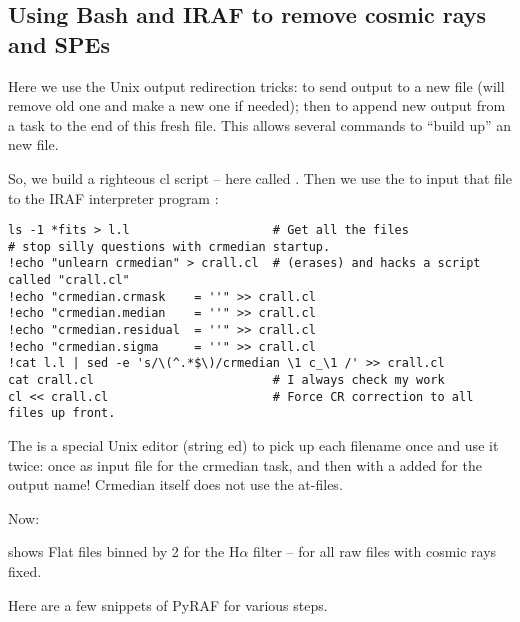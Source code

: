 \documentclass[letter,11pt,oneside]{article}
\begin{document}
\subsection{Using Bash and IRAF to remove cosmic rays and SPEs}

Here we use the Unix output redirection tricks: {\color{verbcolor}{\verb#> l.l#}}
to send output to a new file (will remove old one and make a new one if needed);
then {\color{verbcolor}{\verb#>> l.l#}} to append new output from a task
to the end of this fresh file. This allows several commands to 
``build up'' an new file. 

So, we build a righteous cl script -- here called {\color{verbcolor}{\verb#crall.cl#}}.
Then we use the {\color{verbcolor}{\verb#< crall.cl#}} to input that file
to the IRAF interpreter program {\color{verbcolor}{\verb#cl#}}:

\begingroup \fontsize{10pt}{10pt}
\selectfont
\begin{verbatim} 
ls -1 *fits > l.l                    # Get all the files
# stop silly questions with crmedian startup.
!echo "unlearn crmedian" > crall.cl  # (erases) and hacks a script called "crall.cl"
!echo "crmedian.crmask    = ''" >> crall.cl
!echo "crmedian.median    = ''" >> crall.cl
!echo "crmedian.residual  = ''" >> crall.cl
!echo "crmedian.sigma     = ''" >> crall.cl
!cat l.l | sed -e 's/\(^.*$\)/crmedian \1 c_\1 /' >> crall.cl
cat crall.cl                         # I always check my work
cl << crall.cl                       # Force CR correction to all files up front.
\end{verbatim}
\endgroup

The {\color{verbcolor}{\verb#sed -e 's/\(^.*$\)/crmedian \1 c_\1 /'#}} is
a special Unix editor (string ed) to pick up each filename once
and use it twice: once as input file for the crmedian task, and
then with a {\color{verbcolor}{\verb#c_#}} added for the output name!
Crmedian itself does not use the at-files. 


Now:

{\color{verbcolor}{\verb#hselect c_//@l.l $I "(IMAGETYP ?= 'Flat' && FILTER ?= 'alpha' && XBINNING ?= 2)"#}}

shows Flat files binned by 2 for the H$\alpha$ filter -- for all
raw files with cosmic rays fixed.

Here are a few snippets of PyRAF for various steps.
\end{document}
